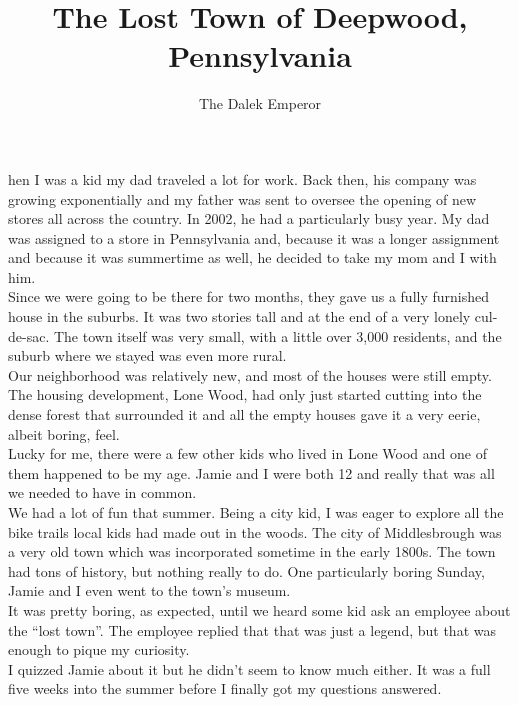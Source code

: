 \documentclass[a5paper]{scrartcl}
\title{The Lost Town of Deepwood, Pennsylvania}
\author{The Dalek Emperor}
\begin{document}
\maketitle

hen I was a kid my dad traveled a lot for work. Back then, his company was growing exponentially and my father was sent to oversee the opening of new stores all across the country. In 2002, he had a particularly busy year. My dad was assigned to a store in Pennsylvania and, because it was a longer assignment and because it was summertime as well, he decided to take my mom and I with him. \\


Since we were going to be there for two months, they gave us a fully furnished house in the suburbs. It was two stories tall and at the end of a very lonely cul-de-sac. The town itself was very small, with a little over 3,000 residents, and the suburb where we stayed was even more rural.  \\


Our neighborhood was relatively new, and most of the houses were still empty. The housing development, Lone Wood, had only just started cutting into the dense forest that surrounded it and all the empty houses gave it a very eerie, albeit boring, feel. \\


Lucky for me, there were a few other kids who lived in Lone Wood and one of them happened to be my age. Jamie and I were both 12 and really that was all we needed to have in common. \\


We had a lot of fun that summer. Being a city kid, I was eager to explore all the bike trails local kids had made out in the woods. The city of Middlesbrough was a very old town which was incorporated sometime in the early 1800s. The town had tons of history, but nothing really to do. One particularly boring Sunday, Jamie and I even went to the town's museum. \\


It was pretty boring, as expected, until we heard some kid ask an employee about the \enquote{lost town}. The employee replied that that was just a legend, but that was enough to pique my curiosity.\\


I quizzed Jamie about it but he didn't seem to know much either. It was a full five weeks into the summer before I finally got my questions answered.\\
\end{document}
